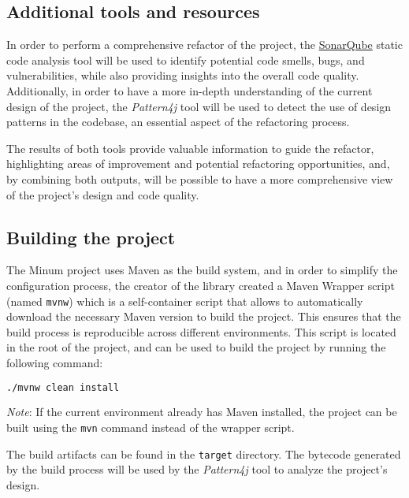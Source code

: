 \subsection{Additional tools and resources}

In order to perform a comprehensive refactor of the project, the \href{https://www.sonarsource.com/}{SonarQube} static code analysis tool will be used to identify potential code smells, bugs, and vulnerabilities, while also providing insights into the overall code quality. Additionally, in order to have a more in-depth understanding of the current design of the project, the \textit{Pattern4j} tool will be used to detect the use of design patterns in the codebase, an essential aspect of the refactoring process.

The results of both tools provide valuable information to guide the refactor, highlighting areas of improvement and potential refactoring opportunities, and, by combining both outputs, will be possible to have a more comprehensive view of the project's design and code quality.

\subsection{Building the project}

The Minum project uses Maven as the build system, and in order to simplify the configuration process, the creator of the library created a Maven Wrapper script (named \texttt{mvnw}) which is a self-container script that allows to automatically download the necessary Maven version to build the project. This ensures that the build process is reproducible across different environments. This script is located in the root of the project, and can be used to build the project by running the following command:

\begin{center}
	\begin{minipage}{0.5\textwidth}
		\begin{lstlisting}[language=bash, caption={Building the project using the Maven Wrapper script}]
    ./mvnw clean install
  \end{lstlisting}
	\end{minipage}
\end{center}

\noindent \textit{Note}: If the current environment already has Maven installed, the project can be built using the \texttt{mvn} command instead of the wrapper script.
\vspace{1em}

\noindent The build artifacts can be found in the \texttt{target} directory. The bytecode generated by the build process will be used by the \textit{Pattern4j} tool to analyze the project's design.
